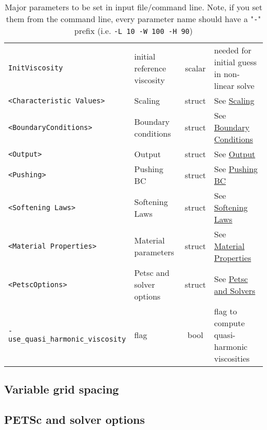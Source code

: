 \documentclass[a4paper,11pt]{article}
\begin{document}
\begin{table}[!htbp]
\begin{center}
{\begin{longtable}{ p{4cm} l c p{7cm} }
\texttt{InitViscosity}&initial reference viscosity&scalar&needed for initial guess in non-linear solve  \\
\texttt{<Characteristic Values>}&Scaling&struct&See \hyperref[sec:scaling]{Scaling} \\
\texttt{<BoundaryConditions>}&Boundary conditions&struct&See \hyperref[sec:bc]{Boundary Conditions} \\
\texttt{<Output>}&Output&struct&See \hyperref[sec:output]{Output} \\
\texttt{<Pushing>}&Pushing BC&struct&See \hyperref[sec:pushing]{Pushing BC} \\
\texttt{<Softening Laws>}&Softening Laws&struct&See \hyperref[sec:softlaws]{Softening Laws} \\
\texttt{<Material Properties>}&Material parameters&struct&See \hyperref[sec:material]{Material Properties} \\
\texttt{<PetscOptions>}&Petsc and solver options&struct&See \hyperref[sec:petsc]{Petsc and Solvers} \\
\texttt{\tiny -use\_quasi\_harmonic\_viscosity}&flag &bool& flag to compute quasi-harmonic viscosities\\
\hline  

  \end{longtable}
  }
  \addtocounter{table}{-1}
  \caption{Major parameters to be set in input file/command line. Note, if you set them from the command line, every parameter name should have a "\texttt{-}" prefix (i.e. \texttt{-L 10 -W 100 -H 90})}
  \label{tab:input0}
  \end{center}
\end{table}

\subsection{Variable grid spacing}
\label{sec:variablegridspacing}

\subsection{PETSc and solver options}
\label{sec:petsc}
\end{document}
